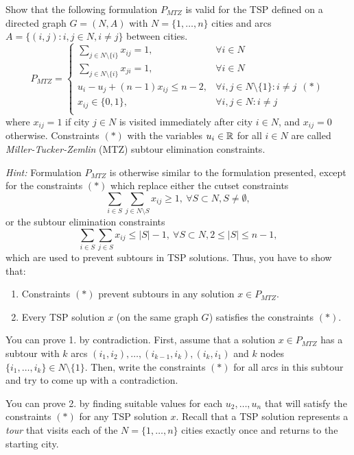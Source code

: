 Show that the following formulation $P_{MTZ}$ is valid for the TSP defined on a directed graph \lb $G = (N,A)$ with $N = \{1,\dots,n\}$ cities and arcs $A = \{(i,j) : i,j\in N, i\neq j\}$ between cities.
\renewcommand*{\arraystretch}{1.3}
\[P_{MTZ} = \left\{
   \begin{array}{ll}
   \displaystyle \sum_{j \in N \setminus \{i\}} x_{ij} = 1, & \forall i \in N \\
   \displaystyle \sum_{j \in N \setminus \{i\}} x_{ji} = 1, & \forall i \in N \\   
   \displaystyle u_{i} - u_{j} + (n-1) x_{ij} \leq n - 2, & \forall i,j \in N \setminus \{ 1 \} : i \neq j ~~(*)\\
    x_{ij} \in \{0,1\}, & \forall i,j \in N : i\neq j\\
  \end{array}
\right.
\]
where $x_{ij} = 1$ if city $j\in N$ is visited immediately after city $i \in N$, and $x_{ij} = 0$ otherwise. Constraints $(*)$ with the variables $u_i \in \mathbb{R}$ for all $i\in N$ are called \emph{Miller-Tucker-Zemlin} (MTZ) subtour elimination constraints. 

\emph{Hint:} Formulation $P_{MTZ}$ is otherwise similar to the formulation presented, except for the constraints $(*)$ which replace either the cutset constraints
$$\sum_{i \in S}\sum_{j \in N \setminus S}x_{ij} \geq 1, \ \forall S \subset N, S \neq \emptyset,$$
or the subtour elimination constraints        
$$\sum_{i \in S}\sum_{j \in S}x_{ij} \leq |S|-1, \ \forall S \subset N, 2 \leq |S| \leq n-1,$$
which are used to prevent subtours in TSP solutions. Thus, you have to show that: 
\begin{enumerate}
\item Constraints $(*)$ prevent subtours in any solution $x\in P_{MTZ}$.
\item Every TSP solution $x$ (on the same graph $G$) satisfies the constraints $(*)$.
\end{enumerate}
You can prove 1. by contradiction. First, assume that a solution $x\in P_{MTZ}$ has a subtour with $k$ arcs $(i_1,i_2),\dots,(i_{k-1},i_k),(i_k,i_1)$ and $k$ nodes $\{i_1,\dots,i_k\} \in N\setminus\{1\}$. Then, write the constraints $(*)$ for all arcs in this subtour and try to come up with a contradiction.

You can prove 2. by finding suitable values for each $u_2,\dots,u_n$ that will satisfy the constraints $(*)$ for any TSP solution $x$. Recall that a TSP solution represents a \emph{tour} that visits each of the $N = \{1,\dots,n\}$ cities exactly once and returns to the starting city.
